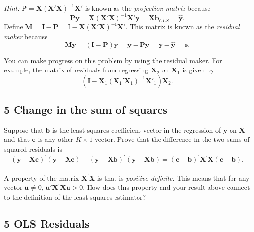 \documentclass[11pt]{article}
\begin{document}
{\footnotesize
\emph{Hint:} $\boldsymbol{P}=\boldsymbol{X}\left(\boldsymbol{X}\boldsymbol{'X}\right)^{-1}\boldsymbol{X}'$
is known as the \emph{projection matrix }because 
\[
\boldsymbol{P}\boldsymbol{y}=\boldsymbol{X}\left(\boldsymbol{X}\boldsymbol{'X}\right)^{-1}\boldsymbol{X}'\boldsymbol{y}=\boldsymbol{X}\boldsymbol{b}_{OLS}=\hat{\boldsymbol{y}}.
\]
Define $\boldsymbol{M}=\boldsymbol{I}-\boldsymbol{P}=\boldsymbol{I}-\boldsymbol{X}\left(\boldsymbol{X}\boldsymbol{'X}\right)^{-1}\boldsymbol{X}'$.
This matrix is known as the \emph{residual maker} because
\[
\boldsymbol{M}\boldsymbol{y}=\left(\boldsymbol{I}-\boldsymbol{P}\right)\boldsymbol{y}=\boldsymbol{y}-\boldsymbol{P}\boldsymbol{y}=\boldsymbol{y}-\hat{\boldsymbol{y}}=\boldsymbol{e}.
\]

You can make progress on this problem by using the residual maker.
For example, the matrix of residuals from regressing $\boldsymbol{X}_{2}$
on $\boldsymbol{X}_{1}$ is given by 
\[
\left(\boldsymbol{I}-\boldsymbol{X}_{1}\left(\boldsymbol{X}_{1}\boldsymbol{'X}_{1}\right)^{-1}\boldsymbol{X}'_{1}\right)\boldsymbol{X}_{2}.
\]
}



\subsection*{5 Change in the sum of squares}
 Suppose that $\boldsymbol{b}$ is the least
squares coefficient vector in the regression of $\boldsymbol{y}$ on $\boldsymbol{X}$ and that
$\boldsymbol{c}$ is any other $K\times1$ vector. Prove that the difference in
the two sums of squared residuals is 
\[
(\boldsymbol{y}-\boldsymbol{X} \boldsymbol{c})^{\prime}(\boldsymbol{y}-\boldsymbol{X} \boldsymbol{c})-
(\boldsymbol{y}-\boldsymbol{X} \boldsymbol{b})^{\prime}(\boldsymbol{y}-\boldsymbol{X} \boldsymbol{b})=
(\boldsymbol{c}-\boldsymbol{b})^{\prime} \boldsymbol{X}{}^{\prime} \boldsymbol{X}(\boldsymbol{c}-\boldsymbol{b}).
\]
\\
A property of the matrix $\boldsymbol{X}^{\prime} \boldsymbol{X}$ is that is \emph{positive
definite}. This means that for any vector $\boldsymbol{u} \ne0$, $\boldsymbol{u}'\boldsymbol{X}^{\prime}\boldsymbol{X} \boldsymbol{u}>0$.
How does this property and your result above connect to the definition
of the least squares estimator? 


\subsection*{5 OLS Residuals} 
\end{document}
